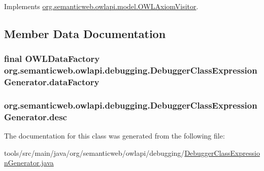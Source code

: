 Implements \hyperlink{interfaceorg_1_1semanticweb_1_1owlapi_1_1model_1_1_o_w_l_axiom_visitor_aaaa73f4e22881ab0ff5659c18ce2977c}{org.\-semanticweb.\-owlapi.\-model.\-O\-W\-L\-Axiom\-Visitor}.



\subsection{Member Data Documentation}
\hypertarget{classorg_1_1semanticweb_1_1owlapi_1_1debugging_1_1_debugger_class_expression_generator_a0729084eb315885838086f4d25ab8562}{
\subsubsection[{data\-Factory}]{\setlength{\rightskip}{0pt plus 5cm}final {\bf O\-W\-L\-Data\-Factory} org.\-semanticweb.\-owlapi.\-debugging.\-Debugger\-Class\-Expression\-Generator.\-data\-Factory\hspace{0.3cm}{\ttfamily [private]}}}\label{classorg_1_1semanticweb_1_1owlapi_1_1debugging_1_1_debugger_class_expression_generator_a0729084eb315885838086f4d25ab8562}
\hypertarget{classorg_1_1semanticweb_1_1owlapi_1_1debugging_1_1_debugger_class_expression_generator_a6b90359123ab9ec178f892f92b20d831}{
\subsubsection[{desc}]{ org.\-semanticweb.\-owlapi.\-debugging.\-Debugger\-Class\-Expression\-Generator.\-desc\hspace{0.3cm}{\ttfamily [private]}}}\label{classorg_1_1semanticweb_1_1owlapi_1_1debugging_1_1_debugger_class_expression_generator_a6b90359123ab9ec178f892f92b20d831}


The documentation for this class was generated from the following file\-:\begin{DoxyCompactItemize}
\item 
tools/src/main/java/org/semanticweb/owlapi/debugging/\hyperlink{_debugger_class_expression_generator_8java}{Debugger\-Class\-Expression\-Generator.\-java}\end{DoxyCompactItemize}
